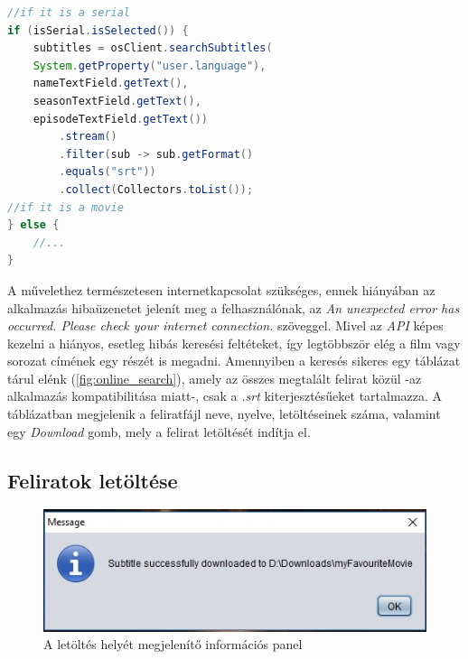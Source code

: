 \begin{spacing}{1.25}
\begin{lstlisting}[caption=Feliratok keresése sorozatokhoz valamint filmekhez, label={lst:search}, language=java]
//if it is a serial
if (isSerial.isSelected()) {
    subtitles = osClient.searchSubtitles(
    System.getProperty("user.language"),
    nameTextField.getText(),
    seasonTextField.getText(),
    episodeTextField.getText())
        .stream()
        .filter(sub -> sub.getFormat()
        .equals("srt"))
        .collect(Collectors.toList());
//if it is a movie
} else {
    //...
}
\end{lstlisting}
\end{spacing}

A művelethez természetesen internetkapcsolat szükséges, ennek hiányában az alkalmazás hibaüzenetet jelenít meg a felhasználónak, az \textit{An unexpected error has occurred. Please check your internet connection.} szöveggel. Mivel az \textit{API} képes kezelni a hiányos, esetleg hibás keresési feltéteket, így legtöbbször elég a film vagy sorozat címének egy részét is megadni. Amennyiben a keresés sikeres egy táblázat tárul elénk (\ref{fig:online_search}), amely az összes megtalált felirat közül -az alkalmazás kompatibilitása miatt-, csak a \textit{.srt} kiterjesztésűeket tartalmazza. A táblázatban megjelenik a feliratfájl neve, nyelve, letöltéseinek száma, valamint egy \textit{Download} gomb, mely a felirat letöltését indítja el.

\subsection{Feliratok letöltése}

\begin{spacing}{1.25}
\begin{figure}
  \includegraphics[width=\linewidth]{images/downloaded_sub.jpg}
  \caption{A letöltés helyét megjelenítő információs panel}
  \label{fig:downloaded_sub}
\end{figure}
\end{spacing}

